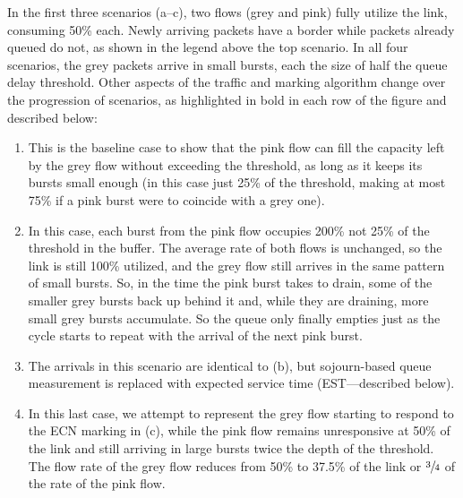 In the first three scenarios (a--c), two flows (grey and pink) fully utilize the link, consuming 50\% each. Newly arriving packets have a border while packets already queued do not, as shown in the legend above the top scenario. In all four scenarios, the grey packets arrive in small bursts, each the size of half the queue delay threshold. Other aspects of the traffic and marking algorithm change over the progression of scenarios, as highlighted in bold in each row of the figure and described below:
\begin{enumerate}[nosep, label=\alph*)]
	\item This is the baseline case to show that the pink flow can fill the capacity left by the grey flow without exceeding the threshold, as long as it keeps its bursts small enough (in this case just 25\% of the threshold, making at most 75\% if a pink burst were to coincide with a grey one). 
	\item In this case, each burst from the pink flow occupies 200\% not 25\% of the threshold in the buffer. The average rate of both flows is unchanged, so the link is still 100\% utilized, and the grey flow still arrives in the same pattern of small bursts. So, in the time the pink burst takes to drain, some of the smaller grey bursts back up behind it and, while they are draining, more small grey bursts accumulate. So the queue only finally empties just as the cycle starts to repeat with the arrival of the next pink burst.
	\item The arrivals in this scenario are identical to (b), but sojourn-based queue measurement is replaced with expected service time (EST---described below).
	\item In this last case, we attempt to represent the grey flow starting to respond to the ECN marking in (c), while the pink flow remains unresponsive at 50\% of the link and still arriving in large bursts twice the depth of the threshold. The flow rate of the grey flow reduces from 50\% to 37.5\% of the link or \(\sfrac{3}{4}\) of the rate of the pink flow.
\end{enumerate}

